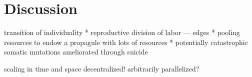 \section{Discussion}

transition of individuality
  * reproductive division of labor --- edges
  * pooling resources to endow a propagule with lots of resources
  * potentially catastrophic somatic mutations ameliorated through suicide

scaling in time and space
decentralized! arbitrarily parallelized?
